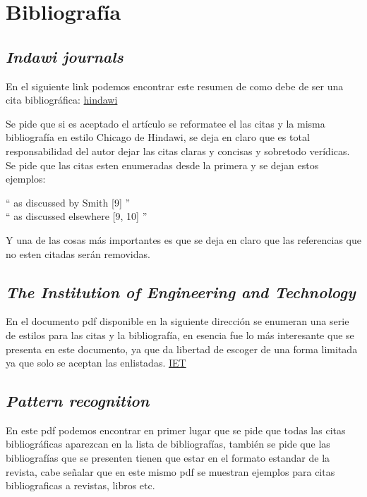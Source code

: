 \documentclass[letterpaper, 10 pt]{article}
\begin{document}
\section*{Bibliografía}
\subsection*{{\textit{Indawi journals}}}
En el siguiente link podemos encontrar este resumen de como debe de ser una cita bibliográfica: \href{https://www.hindawi.com/journals/je/guidelines/}{hindawi}

Se pide que si es aceptado el artículo se reformatee el las citas y la misma bibliografía en estilo Chicago de Hindawi, se deja en claro que es total responsabilidad del autor dejar las citas claras y concisas y sobretodo verídicas. Se pide que las citas esten enumeradas desde la primera y se dejan estos ejemplos:
\begin{center}
	`` as discussed by Smith [9] '' \\ `` as discussed elsewhere [9, 10] ''
\end{center}  
Y una de las cosas más importantes es que se deja en claro que las referencias que no esten citadas serán removidas.
\subsection*{{\textit{The Institution of Engineering and Technology}}}
En el documento pdf disponible en la siguiente dirección se enumeran una serie de estilos para las citas y la bibliografía, en esencia fue lo más interesante que se presenta en este documento, ya que da libertad de escoger de una forma limitada ya que solo se aceptan las enlistadas.
\href{https://authorservices.wiley.com/asset/Author%20Guidelines%20Standard%20Reference%20Text.pdf}{IET}

\subsection*{{\textit{Pattern recognition}}}
En este pdf podemos encontrar en primer lugar que se pide que todas las citas bibliográficas aparezcan en la lista de bibliografías, también se pide que las bibliografías que se presenten tienen que estar en el formato estandar de la revista, cabe señalar que en este mismo pdf se muestran ejemplos para citas bibliograficas a revistas, libros etc.
\end{document}
